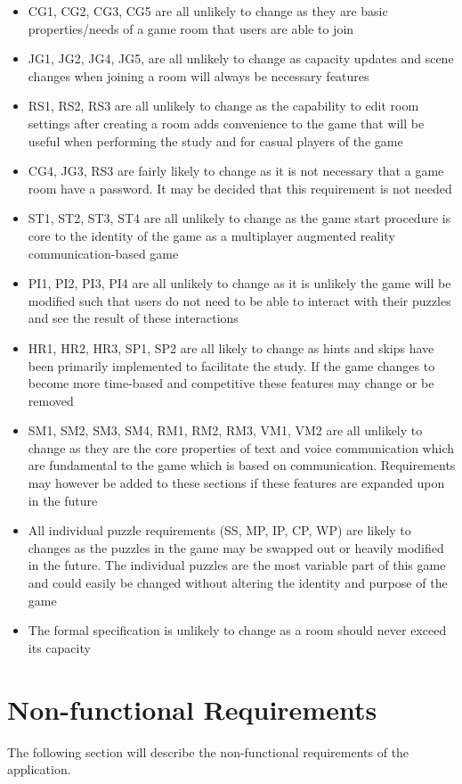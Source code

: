 \documentclass[12pt]{article}
\begin{document}
\begin{itemize}
    \item CG1, CG2, CG3, CG5 are all unlikely to change as they are basic properties/needs of a game room that users are able to join
    \item JG1, JG2, JG4, JG5, are all unlikely to change as capacity updates and scene changes when joining a room will always be necessary features
    \item RS1, RS2, RS3 are all unlikely to change as the capability to edit room settings after creating a room adds convenience to the game that will be useful when performing the study and for casual players of the game
    \item CG4, JG3, RS3 are fairly likely to change as it is not necessary that a game room have a password. It may be decided that this requirement is not needed
    \item ST1, ST2, ST3, ST4 are all unlikely to change as the game start procedure is core to the identity of the game as a multiplayer augmented reality communication-based game
    \item PI1, PI2, PI3, PI4 are all unlikely to change as it is unlikely the game will be modified such that users do not need to be able to interact with their puzzles and see the result of these interactions
    \item HR1, HR2, HR3, SP1, SP2 are all likely to change as hints and skips have been primarily implemented to facilitate the study. If the game changes to become more time-based and competitive these features may change or be removed
    \item SM1, SM2, SM3, SM4, RM1, RM2, RM3, VM1, VM2 are all unlikely to change as they are the core properties of text and voice communication which are fundamental to the game which is based on communication. Requirements may however be added to these sections if these features are expanded upon in the future
    \item All individual puzzle requirements (SS, MP, IP, CP, WP) are likely to changes as the puzzles in the game may be swapped out or heavily modified in the future. The individual puzzles are the most variable part of this game and could easily be changed without altering the identity and purpose of the game
    \item The formal specification is unlikely to change as a room should never exceed its capacity
\end{itemize}

\section{Non-functional Requirements}
The following section will describe the non-functional requirements of the application.
\end{document}
